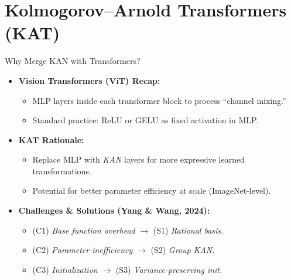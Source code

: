 \documentclass{beamer}
\begin{document}
\section{Kolmogorov--Arnold Transformers (KAT)}
\begin{frame}{Why Merge KAN with Transformers?}
    \begin{itemize}
        \item \textbf{Vision Transformers (ViT) Recap:}
              \begin{itemize}
                  \item MLP layers inside each transformer block to process ``channel mixing.''
                  \item Standard practice: ReLU or GELU as fixed activation in MLP.
              \end{itemize}
        \item \textbf{KAT Rationale:}
              \begin{itemize}
                  \item Replace MLP with \emph{KAN} layers for more expressive learned transformations.
                  \item Potential for better parameter efficiency at scale (ImageNet-level).
              \end{itemize}
        \item \textbf{Challenges \& Solutions (Yang \& Wang, 2024):}
              \begin{itemize}
                  \item (C1) \emph{Base function overhead} $\rightarrow$ (S1) \emph{Rational basis.}
                  \item (C2) \emph{Parameter inefficiency} $\rightarrow$ (S2) \emph{Group KAN.}
                  \item (C3) \emph{Initialization} $\rightarrow$ (S3) \emph{Variance-preserving init.}
              \end{itemize}
    \end{itemize}
\end{frame}

\end{document}
